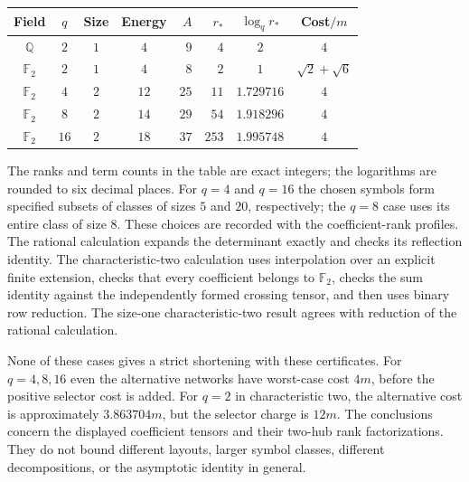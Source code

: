 \begin{center}
\begin{tabular}{@{}ccccrrcc@{}}
\toprule
Field & $q$ & Size & Energy & $A$ & $r_*$ & $\log_qr_*$ & Cost$/m$\\
\midrule
$\mathbb Q$ & $2$ & $1$ & $4$ & $9$ & $4$ & $2$ & $4$\\
$\mathbb F_2$ & $2$ & $1$ & $4$ & $8$ & $2$ & $1$ & $\sqrt2+\sqrt6$\\
$\mathbb F_2$ & $4$ & $2$ & $12$ & $25$ & $11$ & $1.729716$ & $4$\\
$\mathbb F_2$ & $8$ & $2$ & $14$ & $29$ & $54$ & $1.918296$ & $4$\\
$\mathbb F_2$ & $16$ & $2$ & $18$ & $37$ & $253$ & $1.995748$ & $4$\\
\bottomrule
\end{tabular}
\end{center}

The ranks and term counts in the table are exact integers; the logarithms are rounded to six decimal places. For $q=4$ and $q=16$ the chosen symbols form specified subsets of classes of sizes $5$ and $20$, respectively; the $q=8$ case uses its entire class of size $8$. These choices are recorded with the coefficient-rank profiles. The rational calculation expands the determinant exactly and checks its reflection identity. The characteristic-two calculation uses interpolation over an explicit finite extension, checks that every coefficient belongs to $\mathbb F_2$, checks the sum identity against the independently formed crossing tensor, and then uses binary row reduction. The size-one characteristic-two result agrees with reduction of the rational calculation.

None of these cases gives a strict shortening with these certificates. For $q=4,8,16$ even the alternative networks have worst-case cost $4m$, before the positive selector cost is added. For $q=2$ in characteristic two, the alternative cost is approximately $3.863704m$, but the selector charge is $12m$. The conclusions concern the displayed coefficient tensors and their two-hub rank factorizations. They do not bound different layouts, larger symbol classes, different decompositions, or the asymptotic identity in general.

